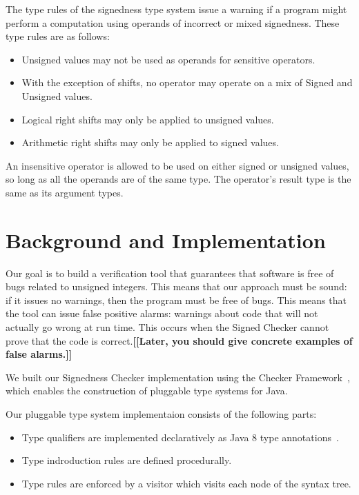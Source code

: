 \documentclass{sig-alternate-05-2015}
\newcommand{\todo}[1]{{\color{red}\bfseries [[#1]]}}
\begin{document}
The type rules of the signedness type system issue a warning if a program
might perform a computation using operands of incorrect or mixed signedness.
These type rules are as follows:

\begin{itemize}\itemsep 0pt \parskip 0pt
  \item Unsigned values may not be used as operands for sensitive
    operators.
  \item With the exception of shifts, no operator may operate on a mix of
    Signed and Unsigned values.
  \item Logical right shifts may only be applied to unsigned values.
  \item Arithmetic right shifts may only be applied to signed values.
\end{itemize}

An insensitive operator is allowed to be used on either signed or unsigned
values, so long as all the operands are of the same type.  The operator's
result type is the same as its argument types.


\section{Background and Implementation}


Our goal is to build a verification tool that guarantees that software is
free of bugs related to unsigned integers. This means that our approach
must be sound:  if it issues no warnings, then the program must be free of
bugs.
This means that the tool can issue false positive alarms:  warnings about
code that will not actually go wrong at run time.  This occurs when the
Signed Checker cannot prove that the code is correct.\todo{Later, you
  should give concrete examples of false alarms.}

We built our Signedness Checker implementation using the 
Checker Framework~\cite{Ernst2008,DietlDEMS2011}, which enables the
construction of pluggable type systems for Java.

Our pluggable type system implementaion consists of the following parts:

\begin{itemize}\itemsep 0pt \parskip 0pt
  \item Type qualifiers are implemented declaratively as Java 8 type
    annotations~\cite{JSR308-PFD}.
  \item Type indroduction rules are defined procedurally.
  \item Type rules are enforced by a visitor which visits each node of the syntax tree.
\end{itemize}
\end{document}
